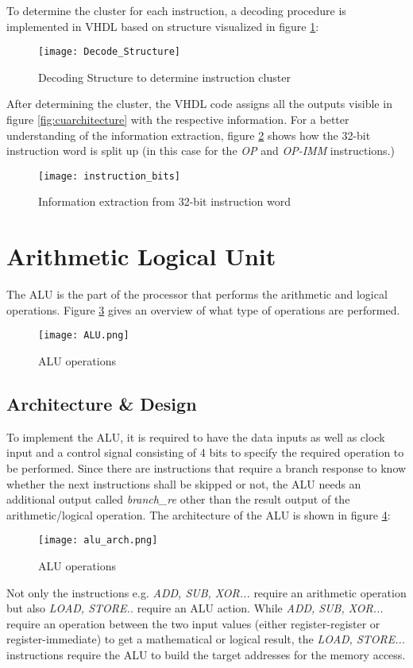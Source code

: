To determine the cluster for each instruction, a decoding procedure is implemented in VHDL based on structure visualized in figure \ref{fig:decode_structure}:

\begin{figure}[H]
	\centering
	\texttt{[image: Decode\_Structure]}
	\caption{Decoding Structure to determine instruction cluster}
	\label{fig:decode_structure}
\end{figure}
After determining the cluster, the VHDL code assigns all the outputs visible in figure \ref{fig:cuarchitecture} with the respective information. For a better understanding of the information extraction, figure \ref{fig:instruction_bits} shows how the 32-bit instruction word is split up (in this case for the \textit{OP} and \textit{OP-IMM} instructions.)
\begin{figure}[H]
	\centering
	\texttt{[image: instruction\_bits]}
	\caption{Information extraction from 32-bit instruction word}
	\label{fig:instruction_bits}
\end{figure}


\section{Arithmetic Logical Unit}
The \acf{ALU} is the part of the processor that performs the arithmetic and logical operations. Figure \ref{fig:alu} gives an overview of what type of operations are performed.
\begin{figure}[H]
	\centering
	\texttt{[image: ALU.png]}
	\caption{ALU operations}
	\label{fig:alu}
\end{figure}

\subsection{Architecture \& Design}
To implement the ALU, it is required to have the data inputs as well as clock input and a control signal consisting of 4 bits to specify the required operation to be performed. Since there are instructions that require a branch response to know whether the next instructions shall be skipped or not, the ALU needs an additional output called \textit{branch\_re} other than the result output of the arithmetic/logical operation. The architecture of the ALU is shown in figure \ref{fig:alu_arch}:
\begin{figure}[H]
	\centering
	\texttt{[image: alu\_arch.png]}
	\caption{ALU operations}
	\label{fig:alu_arch}
\end{figure}
Not only the instructions e.g. \textit{ADD, SUB, XOR...} require an arithmetic operation but also \textit{LOAD, STORE..} require an ALU action. While \textit{ADD, SUB, XOR...} require an operation between the two input values (either register-register or register-immediate) to get a mathematical or logical result, the \textit{LOAD, STORE...} instructions require the ALU to build the target addresses for the memory access.
